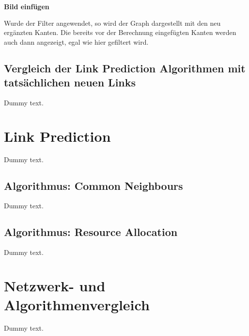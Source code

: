 \textbf{Bild einfügen}

Wurde der Filter angewendet, so wird der Graph dargestellt mit den neu ergänzten Kanten. Die bereits vor der Berechnung
eingefügten Kanten werden auch dann angezeigt, egal wie hier gefiltert wird.

\subsection{Vergleich der Link Prediction Algorithmen mit tatsächlichen neuen Links}

Dummy text.

\section{Link Prediction}

Dummy text.

\subsection{Algorithmus: Common Neighbours}

Dummy text.

\subsection{Algorithmus: Resource Allocation}

Dummy text.

\section{Netzwerk- und Algorithmenvergleich}

Dummy text.